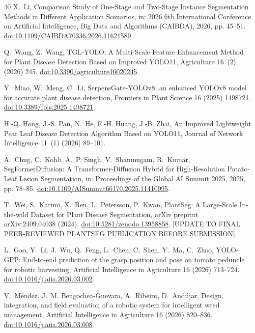 \documentclass[5p,times]{elsarticle}
\begin{document}
\begin{thebibliography}{40}
X.~Li, Comparison Study of One-Stage and Two-Stage Instance Segmentation
  Methods in Different Application Scenarios, in: 2026 6th International
  Conference on Artificial Intelligence, Big Data and Algorithms (CAIBDA),
  2026, pp. 45--51. \href{https://doi.org/10.1109/CAIBDA70336.2026.11621589}{doi:10.1109/CAIBDA70336.2026.11621589}.

Q.~Wang, Z.~Wang, TGL-YOLO: A Multi-Scale Feature Enhancement Method for Plant
  Disease Detection Based on Improved YOLO11, Agriculture 16~(2) (2026) 245. \href{https://doi.org/10.3390/agriculture16020245}{doi:10.3390/agriculture16020245}.

Y.~Miao, W.~Meng, C.~Li, SerpensGate-YOLOv8: an enhanced YOLOv8 model for
  accurate plant disease detection, Frontiers in Plant Science 16 (2025)
  1498721. \href{https://doi.org/10.3389/fpls.2025.1498721}{doi:10.3389/fpls.2025.1498721}.

H.-Q. Hong, J.-S. Pan, N.~He, F.-H. Huang, J.-B. Zhai, An Improved Lightweight
  Pear Leaf Disease Detection Algorithm Based on YOLO11, Journal of Network
  Intelligence 11~(1) (2026) 89--101.

A.~Chug, C.~Kohli, A.~P. Singh, V.~Shanmugam, R.~Kumar, SegFormerDiffusion: A
  Transformer-Diffusion Hybrid for High-Resolution Potato-Leaf Lesion
  Segmentation, in: Proceedings of the Global AI Summit 2025, 2025, pp. 78--85. \href{https://doi.org/10.1109/AISummit66170.2025.11410995}{doi:10.1109/AISummit66170.2025.11410995}.

T.~Wei, S.~Karimi, X.~Ren, L.~Petersson, P.~Kwan, PlantSeg: A Large-Scale
  In-the-wild Dataset for Plant Disease Segmentation, arXiv preprint
  arXiv:2409.04038 (2024). \href{https://doi.org/10.5281/zenodo.13958858}{doi:10.5281/zenodo.13958858}.
  [UPDATE TO FINAL PEER-REVIEWED PLANTSEG PUBLICATION BEFORE SUBMISSION].

L.~Gao, Y.~Li, J.~Wu, Q.~Feng, L.~Chen, C.~Shen, Y.~Ma, C.~Zhao, YOLO-GPP:
  End-to-end prediction of the grasp position and pose on tomato peduncle for
  robotic harvesting, Artificial Intelligence in Agriculture 16 (2026)
  713--724. \href{https://doi.org/10.1016/j.aiia.2026.03.002}{doi:10.1016/j.aiia.2026.03.002}.

V.~M{\'e}ndez, J.~M. Bengochea-Guevara, A.~Ribeiro, D.~And{\'u}jar, Design,
  integration, and field evaluation of a robotic system for intelligent weed
  management, Artificial Intelligence in Agriculture 16 (2026) 820--836. \href{https://doi.org/10.1016/j.aiia.2026.03.008}{doi:10.1016/j.aiia.2026.03.008}.


\end{thebibliography}
\end{document}
